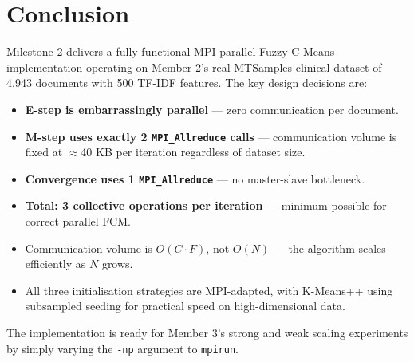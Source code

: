 \documentclass[12pt,a4paper]{article}
\begin{document}
\section{Conclusion}

Milestone 2 delivers a fully functional MPI-parallel Fuzzy C-Means implementation operating on Member 2's real MTSamples clinical dataset of 4,943 documents with 500 TF-IDF features. The key design decisions are:

\begin{itemize}[leftmargin=1.5em]
    \item \textbf{E-step is embarrassingly parallel} --- zero communication per document.
    \item \textbf{M-step uses exactly 2 \texttt{MPI\_Allreduce} calls} --- communication volume is fixed at $\approx$40 KB per iteration regardless of dataset size.
    \item \textbf{Convergence uses 1 \texttt{MPI\_Allreduce}} --- no master-slave bottleneck.
    \item \textbf{Total: 3 collective operations per iteration} --- minimum possible for correct parallel FCM.
    \item Communication volume is $O(C \cdot F)$, not $O(N)$ --- the algorithm scales efficiently as $N$ grows.
    \item All three initialisation strategies are MPI-adapted, with K-Means++ using subsampled seeding for practical speed on high-dimensional data.
\end{itemize}

The implementation is ready for Member 3's strong and weak scaling experiments by simply varying the \texttt{-np} argument to \texttt{mpirun}.
\end{document}
